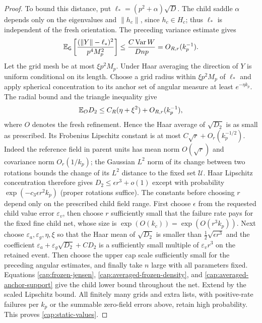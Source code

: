 \begin{proof}
To bound this distance, put $\ell_*=(p^2+\alpha)\sqrt D$.
The child saddle $\alpha$ depends only on the eigenvalues and
$\|h_c\|$, since $h_c\in H_c$; thus $\ell_*$ is independent of the
fresh orientation. The preceding variance estimate gives
\[
 \mathbb E_{\mathsf G}\left[
   \frac{(\|Y\|-\ell_*)^2}{p^4M_p^2}\right]
 \le\frac{C\operatorname{Var} W}{Dnp}=O_{R,r}(k_p^{-1}).
\]
Let the grid mesh be at most $\xi p^2M_p$. Under Haar averaging the
direction of $Y$ is uniform conditional on its length. Choose a grid
radius within $\xi p^2M_p$ of $\ell_*$ and apply spherical
concentration to its anchor set of angular measure at least
$e^{-\eta k_p}$. The radial bound and the triangle inequality give
\[
 \mathbb E_O D_2\le C_R(\eta+\xi^2)+O_{R,r}(k_p^{-1}),
\]
where $O$ denotes the fresh refinement. Hence the Haar average of
$\sqrt{D_2}$ is as small as prescribed. Its Frobenius Lipschitz constant is
at most $C\sqrt r+O_r(k_p^{-1/2})$. Indeed the reference field in parent
units has mean norm $O(\sqrt r)$ and covariance norm $O_r(1/k_p)$;
the Gaussian $L^2$ norm of its change between two rotations bounds the
change of its $L^2$ distance to the fixed set $\mathcal U$.
Haar Lipschitz concentration therefore gives
$D_2\le\epsilon r^3+o(1)$ except with probability
$\exp(-c_3\epsilon r^2k_p)$ (proper rotations suffice).
The constants before choosing $r$ depend only on the prescribed child
field range. First choose $\epsilon$ from the requested child value
error $\varepsilon_v$, then choose $r$ sufficiently small that the
failure rate pays for the fixed fine child net, whose size is
$\exp(O(k_c))=\exp(O(r^3k_p))$. Next choose
$\varepsilon_a,\varepsilon_g,\eta,\xi$ so that the Haar mean of
$\sqrt{D_2}$ is smaller than $\tfrac12\sqrt{\epsilon r^3}$ and the
coefficient $\varepsilon_a+\varepsilon_g\sqrt{D_2}+CD_2$ is a
sufficiently small multiple of $\varepsilon_vr^3$ on the retained event.
Then choose the upper cap scale sufficiently small for the preceding
angular estimates, and finally take $n$ large with all parameters fixed.
Equations
\eqref{cap:frozen-jensen}, \eqref{cap:averaged-frozen-density}, and
\eqref{cap:averaged-anchor-support} give the child lower bound throughout
the net. Extend by the scaled Lipschitz bound.
All finitely many grids and extra lists, with positive-rate failures per
$k_p$ or the summable zero-field errors above, retain high probability.
This proves \eqref{cap:static-values}.

\end{proof}
